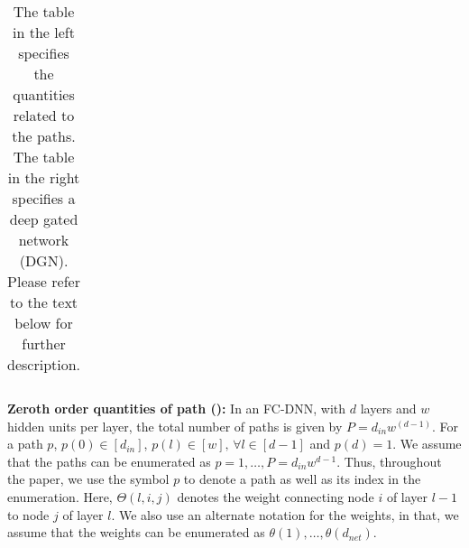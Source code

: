 \begin{table}[!htb]
\begin{minipage}{0.5\columnwidth}
{\begin{tabular}{|c|c|}
\end{tabular}
}
\end{minipage}
\caption{The table in the left specifies the quantities related to the paths. The table in the right specifies a deep gated network (DGN).  Please refer to the text below for further description.}
\label{tb:dgn-path}
\end{table}
\textbf{Zeroth order quantities of path ():} In an FC-DNN, with $d$ layers and $w$ hidden units per layer, the total number of paths is given by $P=d_{in}w^{(d-1)}$. For a path $p$, $p(0)\in [d_{in}]$, $p(l)\in[w],\,\forall l\in[d-1]$ and $p(d)=1$. We assume that the paths can be enumerated as $p=1,\ldots, P = d_{in}w^{d-1}$. Thus, throughout the paper, we use the symbol $p$ to denote a path as well as its index in the enumeration. Here, $\Theta(l,i,j)$ denotes the weight connecting node $i$ of layer $l-1$ to node $j$ of layer $l$. We also use an alternate notation for the weights, in that, we assume that the weights can be enumerated as $\theta(1),\ldots,\theta(d_{net})$. 

